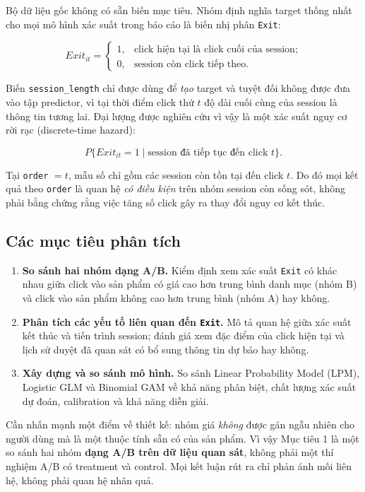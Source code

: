 Bộ dữ liệu gốc không có sẵn biến mục tiêu. Nhóm định nghĩa target thống nhất cho
mọi mô hình xác suất trong báo cáo là biến nhị phân \texttt{Exit}:

\[
Exit_{it} =
\begin{cases}
1, & \text{click hiện tại là click cuối của session;}\\
0, & \text{session còn click tiếp theo.}
\end{cases}
\]

Biến \texttt{session\_length} chỉ được dùng để \emph{tạo} target và tuyệt đối
không được đưa vào tập predictor, vì tại thời điểm click thứ $t$ độ dài cuối cùng
của session là thông tin tương lai. Đại lượng được nghiên cứu vì vậy là một xác
suất nguy cơ rời rạc (discrete-time hazard):

\[
P\{Exit_{it}=1\mid \text{session đã tiếp tục đến click }t\}.
\]

Tại \texttt{order} $=t$, mẫu số chỉ gồm các session còn tồn tại đến click $t$.
Do đó mọi kết quả theo \texttt{order} là quan hệ \emph{có điều kiện} trên nhóm
session còn sống sót, không phải bằng chứng rằng việc tăng số click gây ra thay
đổi nguy cơ kết thúc.

\subsection{Các mục tiêu phân tích}

\begin{enumerate}
  \item \textbf{So sánh hai nhóm dạng A/B.} Kiểm định xem xác suất \texttt{Exit}
  có khác nhau giữa click vào sản phẩm có giá cao hơn trung bình danh mục
  (nhóm B) và click vào sản phẩm không cao hơn trung bình (nhóm A) hay không.

  \item \textbf{Phân tích các yếu tố liên quan đến \texttt{Exit}.} Mô tả quan hệ
  giữa xác suất kết thúc và tiến trình session; đánh giá xem đặc điểm của click
  hiện tại và lịch sử duyệt đã quan sát có bổ sung thông tin dự báo hay không.

  \item \textbf{Xây dựng và so sánh mô hình.} So sánh Linear Probability Model
  (LPM), Logistic GLM và Binomial GAM về khả năng phân biệt, chất lượng xác suất
  dự đoán, calibration và khả năng diễn giải.
\end{enumerate}

Cần nhấn mạnh một điểm về thiết kế: nhóm giá \emph{không} được gán ngẫu nhiên cho
người dùng mà là một thuộc tính sẵn có của sản phẩm. Vì vậy Mục tiêu 1 là một so
sánh hai nhóm \textbf{dạng A/B trên dữ liệu quan sát}, không phải một thí nghiệm
A/B có treatment và control. Mọi kết luận rút ra chỉ phản ánh mối liên hệ, không
phải quan hệ nhân quả.

